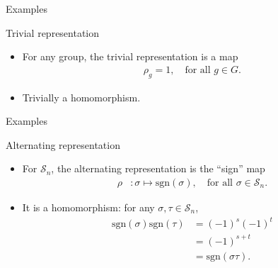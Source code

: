 \documentclass[10pt]{beamer}
\newcommand{\Sym}{\mathcal{S}}
\newcommand{\sgn}{\text{sgn}}
\begin{document}
	\begin{frame}{Examples}
		\begin{block}{Trivial representation}
			\begin{itemize}
				\item For any group, the trivial representation is a map
				\begin{align*}
					\rho_g = 1, \quad \text{for all $g \in G$.}
				\end{align*}
				
				\item Trivially a homomorphism.
			\end{itemize}
			
		\end{block}
	\end{frame}
	\begin{frame}{Examples}
%				
%				

		\begin{block}{Alternating representation}
			\begin{itemize}
				\item For $\Sym_n$, the alternating representation is the ``sign'' map
				\begin{align*}
					\rho &: \sigma \mapsto \sgn(\sigma), \quad \text{for all } \sigma \in \Sym_n.
				\end{align*}\pause
				
				\item It is a homomorphism: for any $\sigma, \tau \in \Sym_n$,
				\begin{align*}
					\sgn(\sigma)\sgn(\tau) &= (-1)^s(-1)^t \\
					&= (-1)^{s+t} \\
					&= \sgn(\sigma\tau).
				\end{align*}
			\end{itemize}
		\end{block}
	\end{frame}
\end{document}
